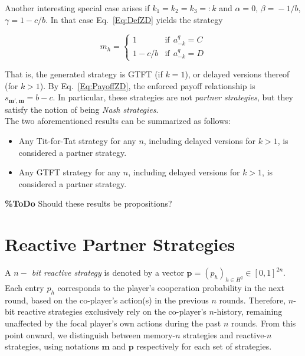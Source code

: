 \documentclass{article}
\theoremstyle{definition}
\begin{document}
Another interesting special case arises if  $k_1\!=\!k_2\!=\!k_3\!=:\!k$ and
$\alpha\!=\!0$, $\beta\!=\!-1/b$, $\gamma\!=\!1\!-\!c/b$. In that case
Eq.~\eqref{Eq:DefZD} yields the strategy

\begin{equation}
m_h = \left\{
\begin{array}{ll}
1	&\text{if}~~a^q_{-k}=C\\
1-c/b	&\text{if}~~a^q_{-k}=D
\end{array}
\right.
\end{equation}

That is, the generated strategy is GTFT (if $k\!=\!1$), or delayed versions
thereof (for $k\!>\!1$). By Eq.~\eqref{Eq:PayoffZD}, the enforced payoff
relationship is $s_{\mathbf{m'}, \mathbf{m}}\!=\!b\!-\!c$. In particular, these
strategies are not {\it partner strategies}, but they satisfy the notion of
being {\it Nash strategies}.\\

The two aforementioned results can be summarized as follows:

\begin{itemize}
  \item Any Tit-for-Tat strategy for any $n$, including delayed versions for $k > 1$,
  is considered a partner strategy.
  \item Any GTFT strategy for any $n$, including delayed versions for $k > 1$,
  is considered a partner strategy.
\end{itemize}

{\bf \%ToDo} Should these results be propositions?

\section{Reactive Partner Strategies}\label{section:reactive_strategies}

A {\it $n-$ bit reactive strategy} is denoted by a vector
$\mathbf{p}=(p_h)_{h\in H^q}\in[0,1]^{2n}$. Each entry $p_h$ corresponds to the
player's cooperation probability in the next round, based on the co-player's
action(s) in the previous $n$ rounds. Therefore, $n$-bit reactive strategies
exclusively rely on the co-player's $n$-history, remaining unaffected by the
focal player's own actions during the past $n$ rounds. From this point onward,
we distinguish between memory-$n$ strategies and reactive-$n$ strategies, using
notations $\mathbf{m}$ and $\mathbf{p}$ respectively for each set of strategies.
\end{document}
